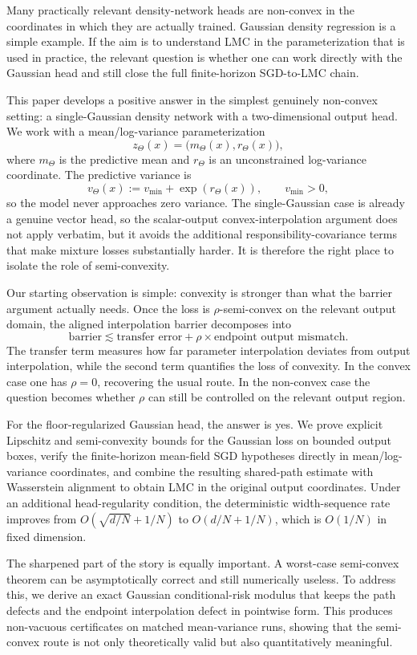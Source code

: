 \documentclass[11pt]{article}
\theoremstyle{definition}
\begin{document}
Many practically relevant density-network heads are non-convex in the
coordinates in which they are actually trained. Gaussian density regression is a
simple example. If the aim is to understand LMC in the parameterization that is
used in practice, the relevant question is whether one can work directly with
the Gaussian head and
still close the full finite-horizon SGD-to-LMC chain.

This paper develops a positive answer in the simplest genuinely non-convex
setting: a single-Gaussian density network with a two-dimensional output head.
We work with a mean/log-variance parameterization
\[
  z_\Theta(x)=\bigl(m_\Theta(x),r_\Theta(x)\bigr),
\]
where $m_\Theta$ is the predictive mean and $r_\Theta$ is an unconstrained
log-variance coordinate. The predictive variance is
\[
  v_\Theta(x):=v_{\min}+\exp(r_\Theta(x)),
  \qquad
  v_{\min}>0,
\]
so the model never approaches zero variance. The single-Gaussian case is already
a genuine vector head, so the scalar-output convex-interpolation argument does
not apply verbatim, but it avoids the additional responsibility-covariance terms
that make mixture losses substantially harder. It is therefore the right place
to isolate the role of semi-convexity.

Our starting observation is simple: convexity is stronger than what the barrier
argument actually needs. Once the loss is $\rho$-semi-convex on the relevant
output domain, the aligned interpolation barrier decomposes into
\[
  \text{barrier}
  \lesssim
  \text{transfer error}
  +
  \rho\times \text{endpoint output mismatch}.
\]
The transfer term measures how far parameter interpolation deviates from output
interpolation, while the second term quantifies the loss of convexity. In the
convex case one has $\rho=0$, recovering the usual route. In the non-convex case
the question becomes whether $\rho$ can still be controlled on the relevant
output region.

For the floor-regularized Gaussian head, the answer is yes. We prove explicit
Lipschitz and semi-convexity bounds for the Gaussian loss on bounded output
boxes, verify the finite-horizon mean-field SGD hypotheses directly in
mean/log-variance coordinates, and combine the resulting shared-path estimate
with Wasserstein alignment to obtain LMC in the original output coordinates.
Under an additional head-regularity condition, the deterministic width-sequence
rate improves from
$O(\sqrt{d/N}+1/N)$ to $O(d/N+1/N)$, which is $O(1/N)$ in fixed dimension.

The sharpened part of the story is equally important. A worst-case semi-convex
theorem can be asymptotically correct and still numerically useless. To address
this, we derive an exact Gaussian conditional-risk modulus that keeps the path
defects and the endpoint interpolation defect in pointwise form. This produces
non-vacuous certificates on matched mean-variance runs, showing that the
semi-convex route is not only theoretically valid but also quantitatively
meaningful.
\end{document}
